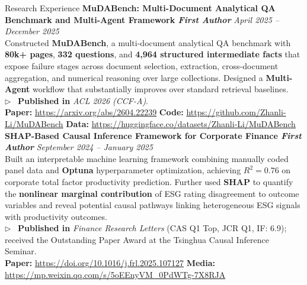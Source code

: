 \documentclass{resume}
\begin{document}
\begin{rSection}{Research Experience}
{\bf MuDABench: Multi-Document Analytical QA Benchmark and Multi-Agent Framework \quad \textit{First Author}} \hfill {\em April 2025 -- December 2025} \\
Constructed \textbf{MuDABench}, a multi-document analytical QA benchmark with \textbf{80k+ pages}, \textbf{332 questions}, and \textbf{4,964 structured intermediate facts} that expose failure stages across document selection, extraction, cross-document aggregation, and numerical reasoning over large collections. Designed a \textbf{Multi-Agent} workflow that substantially improves over standard retrieval baselines. \\
$\triangleright$~ \textbf{Published in} \textit{ACL 2026 (CCF-A)}. \\[-2pt]
{\scriptsize \textbf{Paper:} \url{https://arxiv.org/abs/2604.22239} \quad \textbf{Code:} \url{https://github.com/Zhanli-Li/MuDABench} \quad \textbf{Data:} \url{https://huggingface.co/datasets/Zhanli-Li/MuDABench}}\\[-6pt]

{\bf SHAP-Based Causal Inference Framework for Corporate Finance \quad \textit{First Author}} \hfill {\em September 2024 -- January 2025} \\
Built an interpretable machine learning framework combining manually coded panel data and \textbf{Optuna} hyperparameter optimization, achieving $R^2=0.76$ on corporate total factor productivity prediction. Further used \textbf{SHAP} to quantify the \textbf{nonlinear marginal contribution} of ESG rating disagreement to outcome variables and reveal potential causal pathways linking heterogeneous ESG signals with productivity outcomes. \\
$\triangleright$~ \textbf{Published in} \textit{Finance Research Letters} (CAS Q1 Top, JCR Q1, IF: 6.9); received the Outstanding Paper Award at the Tsinghua Causal Inference Seminar. \\[-2pt]
{\scriptsize \textbf{Paper:} \url{https://doi.org/10.1016/j.frl.2025.107127} \quad \textbf{Media:} \url{https://mp.weixin.qq.com/s/5oEEnyVM_0PdWTg-7X8RJA}}\\[-6pt]

\end{rSection}

\end{document}
